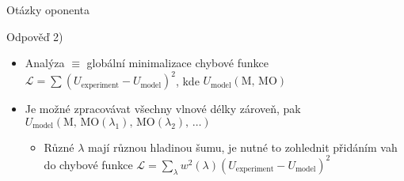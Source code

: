 \begin{frame}{Otázky oponenta}
    \begin{exampleblock}{Odpověď 2)}
        \begin{itemize}
        \item Analýza $\equiv$ globální minimalizace chybové funkce $\mathcal{L} = \sum \left( U_{\textrm{experiment}} - U_{\textrm{model}} \right)^2$, kde $U_{\textrm{model}}(\textrm{M},\,\textrm{MO})$
%
        \item Je možné zpracovávat všechny vlnové délky zároveň, pak $U_{\textrm{model}}(\textrm{M},\,\textrm{MO}(\lambda_1),\,\textrm{MO}(\lambda_2),\,\ldots)$
                \begin{itemize}
                    \item Různé $\lambda$ mají různou hladinou šumu, je nutné to zohlednit přidáním vah do chybové funkce $\mathcal{L}=\sum_\lambda w^2(\lambda) \left(U_{\textrm{experiment}} - U_{\textrm{model}}\right)^2$

\end{itemize}
\end{itemize}
\end{exampleblock}
\end{frame}
